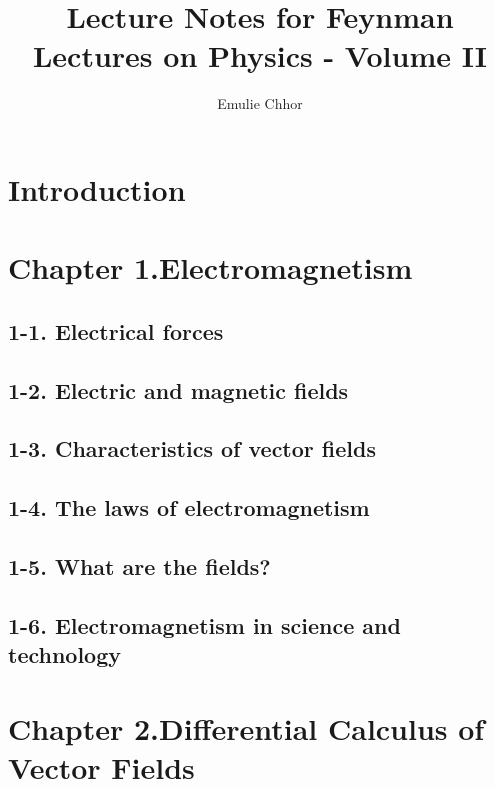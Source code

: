 \documentclass{article}
\begin{document}
\title{Lecture Notes for Feynman Lectures on Physics - Volume II }
\author{Emulie Chhor}
\maketitle

\section*{Introduction}

\newtheorem{definition}{Definition}[subsection]
\newtheorem{theorem}{Theorem}[subsection]
\newtheorem{corollary}{Corollary}[subsection]
\newtheorem{lemma}[theorem]{Lemma}
\newtheorem{proposition}{Proposition}[section]
\newtheorem{axiom}{Axiome}
\newtheorem{property}{Propriété}[subsection]
\newtheorem*{remark}{Remarque}
\newtheorem*{problem}{Problème}
\newtheorem*{intuition}{Intuition}

\section{Chapter 1.Electromagnetism}
\subsection{1-1. Electrical forces}
\subsection{1-2. Electric and magnetic fields}
\subsection{1-3. Characteristics of vector fields}
\subsection{1-4. The laws of electromagnetism}
\subsection{1-5. What are the fields?}
\subsection{1-6. Electromagnetism in science and technology}
\section{Chapter 2.Differential Calculus of Vector Fields}
\end{document}
